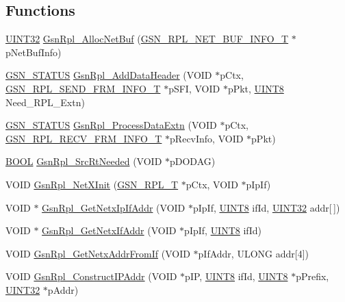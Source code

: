\subsection*{Functions}
\begin{DoxyCompactItemize}
\item 
\hyperlink{a00660_gae1e6edbbc26d6fbc71a90190d0266018}{UINT32} \hyperlink{a00580_a0950ef4f66e15e7fed5c62b497f66d8d}{GsnRpl\_\-AllocNetBuf} (\hyperlink{a00207}{GSN\_\-RPL\_\-NET\_\-BUF\_\-INFO\_\-T} $\ast$pNetBufInfo)
\item 
\hyperlink{a00660_gada5951904ac6110b1fa95e51a9ddc217}{GSN\_\-STATUS} \hyperlink{a00580_ad8318cab256aa5a44eb4a92ee6df0082}{GsnRpl\_\-AddDataHeader} (VOID $\ast$pCtx, \hyperlink{a00211}{GSN\_\-RPL\_\-SEND\_\-FRM\_\-INFO\_\-T} $\ast$pSFI, VOID $\ast$pPkt, \hyperlink{a00660_gab27e9918b538ce9d8ca692479b375b6a}{UINT8} Need\_\-RPL\_\-Extn)
\item 
\hyperlink{a00660_gada5951904ac6110b1fa95e51a9ddc217}{GSN\_\-STATUS} \hyperlink{a00580_ad53acaa20f932c19b337b24c6dffb272}{GsnRpl\_\-ProcessDataExtn} (VOID $\ast$pCtx, \hyperlink{a00208}{GSN\_\-RPL\_\-RECV\_\-FRM\_\-INFO\_\-T} $\ast$pRecvInfo, VOID $\ast$pPkt)
\item 
\hyperlink{a00660_ga1f04022c0a182c51c059438790ea138c}{BOOL} \hyperlink{a00580_a44fd20de7205d1eb6e722f4589a87a36}{GsnRpl\_\-SrcRtNeeded} (VOID $\ast$pDODAG)
\item 
VOID \hyperlink{a00580_a2cfda5e7c9065626caf419f6490e6308}{GsnRpl\_\-NetXInit} (\hyperlink{a00192}{GSN\_\-RPL\_\-T} $\ast$pCtx, VOID $\ast$pIpIf)
\item 
VOID $\ast$ \hyperlink{a00580_af4876dac783f0b66e3604bf3da6c874b}{GsnRpl\_\-GetNetxIpIfAddr} (VOID $\ast$pIpIf, \hyperlink{a00660_gab27e9918b538ce9d8ca692479b375b6a}{UINT8} ifId, \hyperlink{a00660_gae1e6edbbc26d6fbc71a90190d0266018}{UINT32} addr\mbox{[}$\,$\mbox{]})
\item 
VOID $\ast$ \hyperlink{a00580_a9e3d0dc5186bad68603a96de85f0895a}{GsnRpl\_\-GetNetxIfAddr} (VOID $\ast$pIpIf, \hyperlink{a00660_gab27e9918b538ce9d8ca692479b375b6a}{UINT8} ifId)
\item 
VOID \hyperlink{a00580_a215a8d9afe200c2ef1bf16a69150c7d6}{GsnRpl\_\-GetNetxAddrFromIf} (VOID $\ast$pIfAddr, ULONG addr\mbox{[}4\mbox{]})
\item 
VOID \hyperlink{a00580_a869a02303383d41940c43fbc3a806882}{GsnRpl\_\-ConstructIPAddr} (VOID $\ast$pIP, \hyperlink{a00660_gab27e9918b538ce9d8ca692479b375b6a}{UINT8} ifId, \hyperlink{a00660_gab27e9918b538ce9d8ca692479b375b6a}{UINT8} $\ast$pPrefix, \hyperlink{a00660_gae1e6edbbc26d6fbc71a90190d0266018}{UINT32} $\ast$pAddr)

\end{DoxyCompactItemize}
